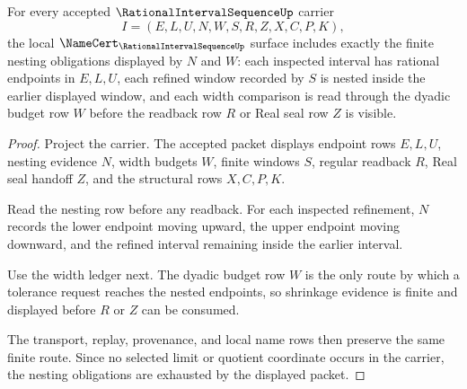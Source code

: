 \begin{theorem}
\label{thm:rational-interval-sequence-nesting-obligations}
For every accepted $\RationalIntervalSequenceUp$ carrier
$$
I=(E,L,U,N,W,S,R,Z,X,C,P,K),
$$
the local $\NameCert_{\RationalIntervalSequenceUp}$ surface includes exactly the finite nesting obligations displayed by $N$ and $W$: each inspected interval has rational endpoints in $E,L,U$, each refined window recorded by $S$ is nested inside the earlier displayed window, and each width comparison is read through the dyadic budget row $W$ before the readback row $R$ or Real seal row $Z$ is visible.
\end{theorem}
\begin{proof}
Project the carrier. The accepted packet displays endpoint rows $E,L,U$, nesting evidence $N$, width budgets $W$, finite windows $S$, regular readback $R$, Real seal handoff $Z$, and the structural rows $X,C,P,K$.

Read the nesting row before any readback. For each inspected refinement, $N$ records the lower endpoint moving upward, the upper endpoint moving downward, and the refined interval remaining inside the earlier interval.

Use the width ledger next. The dyadic budget row $W$ is the only route by which a tolerance request reaches the nested endpoints, so shrinkage evidence is finite and displayed before $R$ or $Z$ can be consumed.

The transport, replay, provenance, and local name rows then preserve the same finite route. Since no selected limit or quotient coordinate occurs in the carrier, the nesting obligations are exhausted by the displayed packet.
\end{proof}

